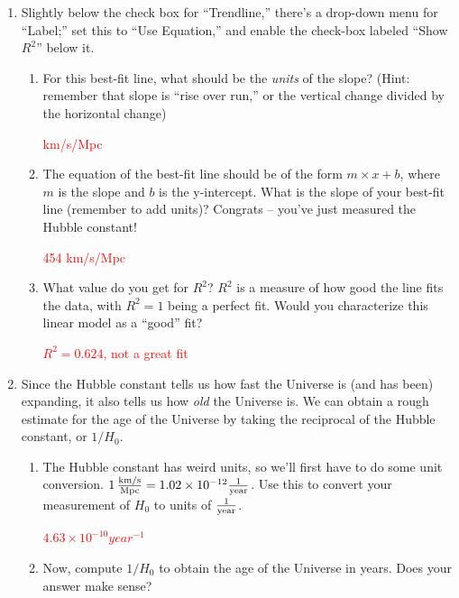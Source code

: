 \documentclass[11pt]{article}
\begin{document}
\begin{enumerate}
\begin{enumerate}
            \textcolor{red}{Peculiar velocities cause deviations in nearby universe.}
        \end{enumerate}

    \item [10 pts] Slightly below the check box for ``Trendline,'' there's a drop-down menu for ``Label;'' set this to ``Use Equation,'' and enable the check-box labeled ``Show $R^2$'' below it.
        \begin{enumerate}
            \item For this best-fit line, what should be the \emph{units} of the slope? (Hint: remember that slope is ``rise over run,'' or the vertical change divided by the horizontal change)
            
            \textcolor{red}{km/s/Mpc}
            
            \item The equation of the best-fit line should be of the form $m \times x + b$, where $m$ is the slope and $b$ is the y-intercept. What is the slope of your best-fit line (remember to add units)? Congrats -- you've just measured the Hubble constant!
            
            \textcolor{red}{454 km/s/Mpc}
            
            \item What value do you get for $R^2$? $R^2$ is a measure of how good the line fits the data, with $R^2 = 1$ being a perfect fit. Would you characterize this linear model as a ``good'' fit?
            
            \textcolor{red}{$R^2=0.624$, not a great fit}
        \end{enumerate}

    \item [10 pts] Since the Hubble constant tells us how fast the Universe is (and has been) expanding, it also tells us how \emph{old} the Universe is. We can obtain a rough estimate for the age of the Universe by taking the reciprocal of the Hubble constant, or $1/H_0$.
    \begin{enumerate}
        \item The Hubble constant has weird units, so we'll first have to do some unit conversion. $1 \rm \, \frac{km/s}{Mpc} = 1.02 \times 10^{-12} \frac{1}{year}$. Use this to convert your measurement of $H_0$ to units of $\frac{1}{\rm year}$.
        
        \textcolor{red}{$4.63 \times 10^{-10} year^{-1}$}
        
        \item Now, compute $1/H_0$ to obtain the age of the Universe in years. Does your answer make sense?
        

\end{enumerate}
\end{enumerate}
\end{document}
